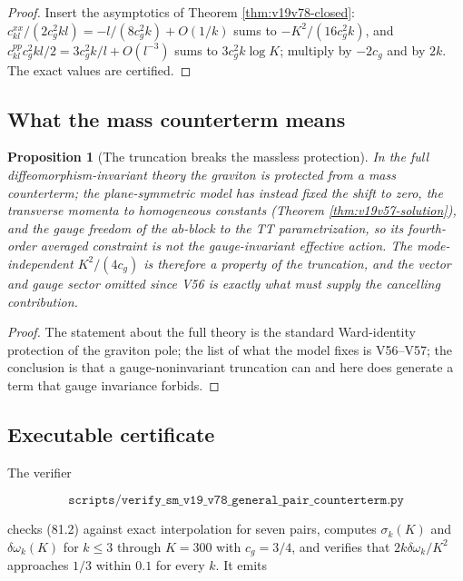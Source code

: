 \documentclass[11pt]{article}
\newtheorem{proposition}[theorem]{Proposition}
\theoremstyle{remark}
\begin{document}
\begin{proof}
Insert the asymptotics of Theorem \ref{thm:v19v78-closed}:
\(c^{xx}_{kl}/(2c_g^2kl)=-l/(8c_g^2k)+O(1/k)\) sums to
\(-K^2/(16c_g^2k)\), and \(c^{pp}_{kl}c_g^2kl/2=3c_g^2k/l+O(l^{-3})\)
sums to \(3c_g^2k\log K\); multiply by \(-2c_g\) and by \(2k\).  The
exact values are certified.
\end{proof}

\subsection{What the mass counterterm means}

\begin{proposition}[The truncation breaks the massless protection]
\label{prop:v19v78-gauge}
In the full diffeomorphism-invariant theory the graviton is protected
from a mass counterterm; the plane-symmetric model has instead fixed
the shift to zero, the transverse momenta to homogeneous constants
(Theorem \ref{thm:v19v57-solution}), and the gauge freedom of the
\(ab\)-block to the TT parametrization, so its fourth-order averaged
constraint is not the gauge-invariant effective action.  The
mode-independent \(K^2/(4c_g)\) is therefore a property of the
truncation, and the vector and gauge sector omitted since V56 is
exactly what must supply the cancelling contribution.
\end{proposition}

\begin{proof}
The statement about the full theory is the standard Ward-identity
protection of the graviton pole; the list of what the model fixes is
V56--V57; the conclusion is that a gauge-noninvariant truncation can
and here does generate a term that gauge invariance forbids.
\end{proof}

\subsection{Executable certificate}

The verifier

\[
 \texttt{scripts/verify\_sm\_v19\_v78\_general\_pair\_counterterm.py}
                                                                    \tag{81.4}
\]

checks (81.2) against exact interpolation for seven pairs, computes
\(\sigma_k(K)\) and \(\delta\omega_k(K)\) for \(k\leq3\) through
\(K=300\) with \(c_g=3/4\), and verifies that \(2k\delta\omega_k/K^2\)
approaches \(1/3\) within \(0.1\) for every \(k\).  It emits
\end{document}

